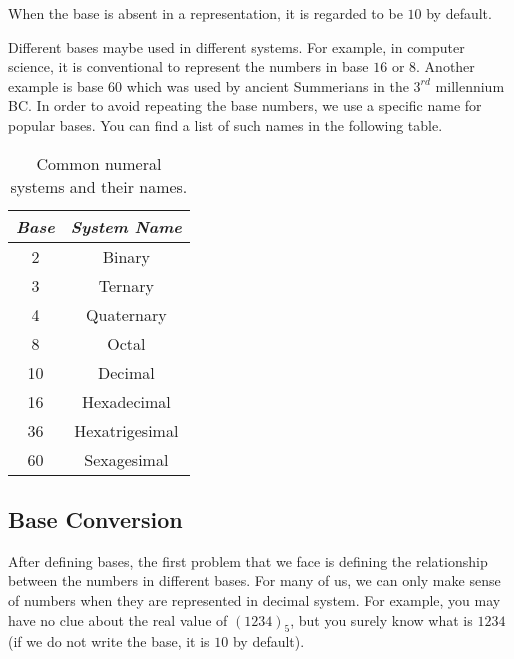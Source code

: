 \documentclass{subfile}
\begin{document}
	\begin{note}
		When the base is absent in a representation, it is regarded to be $10$ by default.
	\end{note}
	Different bases maybe used in different systems. For example, in computer science, it is conventional to represent the numbers in base $16$ or $8$. Another example is base $60$ which was used by ancient Summerians in the $3^{rd}$ millennium BC. In order to avoid repeating the base numbers, we use a specific name for popular bases. You can find a list of such names in the following table.
		\begin{table}
			\centering
		\begin{tabular}{ | c | c | }
			\hline
			\textit{Base} & \textit{System Name} \\ \hline
			2 & Binary \\ \hline
			3 & Ternary \\ \hline
			4 & Quaternary \\ \hline
			8 & Octal \\ \hline
			10 & Decimal \\ \hline
			16 & Hexadecimal \\ \hline
			36 & Hexatrigesimal \\ \hline
			60 & Sexagesimal \\ \hline
		\end{tabular}
	\caption{Common numeral systems and their names.} \label{tab:numeral}
	\end{table}
	\subsection{Base Conversion}
	After defining bases, the first problem that we face is defining the relationship between the numbers in different bases. For many of us, we can only make sense of numbers when they are represented in decimal system. For example, you may have no clue about the real value of $(1234)_{5}$, but you surely know what is $1234$ (if we do not write the base, it is $10$ by default).
\end{document}
